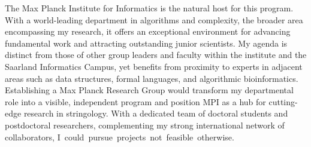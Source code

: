 \documentclass[a4paper,11pt]{article}
\begin{document}
The Max Planck Institute for Informatics is the natural host for this program. With a world-leading department in algorithms and complexity, the broader area encompassing my research, it offers an exceptional environment for advancing fundamental work and attracting outstanding junior scientists. My agenda is distinct from those of other group leaders and faculty within the institute and the Saarland Informatics Campus, yet benefits from proximity to experts in adjacent areas such as data structures, formal languages, and algorithmic bioinformatics. Establishing a Max Planck Research Group would transform my departmental role into a visible, independent program and position MPI as a hub for cutting-edge research in stringology. With a dedicated team of doctoral students and postdoctoral researchers, complementing my strong international network of collaborators, \mbox{I could pursue projects not feasible otherwise}.
\end{document}

